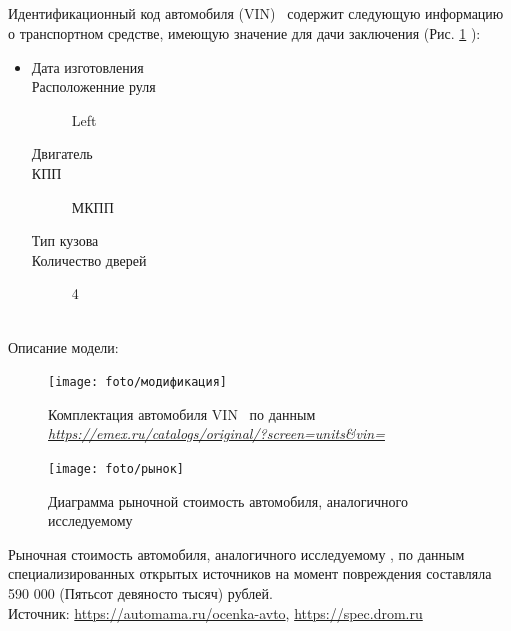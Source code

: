 \subparagraph*{} Идентификационный код автомобиля (VIN)  \vin \, содержит следующую информацию о транспортном средстве, имеющую значение для 	дачи заключения (Рис. \ref{fig:vin} ):\\[3mm]
%	
	\noindent\parbox[]{10cm}{
		\begin{itemize}
			\item[ ] 
			\begin{description}
				\item[Дата изготовления] \hfill {}
				\item[Расположенние руля] \hfill Left
				\item[Двигатель] \hfill {}
				\item[КПП] \hfill МКПП
				\item[Тип кузова] \hfill  {}
				\item[Количество дверей] \hfill 4 
					
			\end{description}
	\end{itemize}}\\
	
	

Описание модели:
	\begin{figure}[H]
		\centering
		\texttt{[image: foto/модификация]}
		\caption[]{{\footnotesize Комплектация автомобиля VIN \vin\, по данным\textit{ \url{https://emex.ru/catalogs/original/?screen=units\&vin=}}} }
		\label{fig:vin}
	\end{figure}
	
\vspace{3mm}

\begin{figure}[H]
    \centering
    \texttt{[image: foto/рынок]}
    \caption[]{Диаграмма рыночной стоимость автомобиля, аналогичного исследуемому \ %
    }
    \label{fig:рыночная}
\end{figure}

Рыночная стоимость  автомобиля, аналогичного исследуемому , по данным специализированных открытых источников на момент повреждения  составляла 590 000 (Пятьсот девяносто тысяч) рублей.\\
Источник:  \url{https://automama.ru/ocenka-avto}, \url{https://spec.drom.ru}


